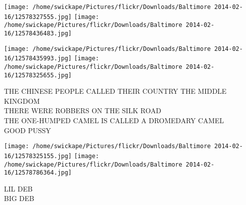 \documentclass[10pt,letterpaper]{article}
\begin{document}
\texttt{[image: /home/swickape/Pictures/flickr/Downloads/Baltimore 2014-02-16/12578327555.jpg]}
\texttt{[image: /home/swickape/Pictures/flickr/Downloads/Baltimore 2014-02-16/12578436483.jpg]}

\texttt{[image: /home/swickape/Pictures/flickr/Downloads/Baltimore 2014-02-16/12578435993.jpg]}
\texttt{[image: /home/swickape/Pictures/flickr/Downloads/Baltimore 2014-02-16/12578325655.jpg]}

THE CHINESE PEOPLE CALLED THEIR COUNTRY THE MIDDLE KINGDOM\\
THERE WERE ROBBERS ON THE SILK ROAD\\
THE ONE{-}HUMPED CAMEL IS CALLED A DROMEDARY CAMEL\\
GOOD PUSSY\\
\pagebreak

\texttt{[image: /home/swickape/Pictures/flickr/Downloads/Baltimore 2014-02-16/12578325155.jpg]}
\texttt{[image: /home/swickape/Pictures/flickr/Downloads/Baltimore 2014-02-16/12578786364.jpg]}

LIL DEB\\
BIG DEB\\
\pagebreak
\end{document}
